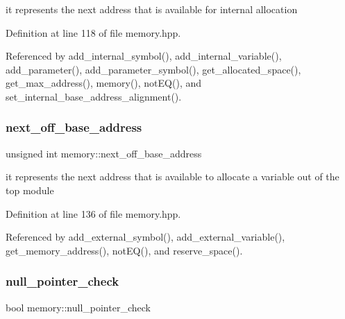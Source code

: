 it represents the next address that is available for internal allocation 



Definition at line 118 of file memory.\+hpp.



Referenced by add\+\_\+internal\+\_\+symbol(), add\+\_\+internal\+\_\+variable(), add\+\_\+parameter(), add\+\_\+parameter\+\_\+symbol(), get\+\_\+allocated\+\_\+space(), get\+\_\+max\+\_\+address(), memory(), not\+E\+Q(), and set\+\_\+internal\+\_\+base\+\_\+address\+\_\+alignment().

\mbox{\label{classmemory_a276dd744b44a4862ff5d6c294d638965}} 
\subsubsection{\texorpdfstring{next\+\_\+off\+\_\+base\+\_\+address}{next\_off\_base\_address}}
{\footnotesize\ttfamily unsigned int memory\+::next\+\_\+off\+\_\+base\+\_\+address\hspace{0.3cm}{\ttfamily [private]}}



it represents the next address that is available to allocate a variable out of the top module 



Definition at line 136 of file memory.\+hpp.



Referenced by add\+\_\+external\+\_\+symbol(), add\+\_\+external\+\_\+variable(), get\+\_\+memory\+\_\+address(), not\+E\+Q(), and reserve\+\_\+space().

\mbox{\label{classmemory_af76a7dbf11a240c8f8664444295701aa}} 
\subsubsection{\texorpdfstring{null\+\_\+pointer\+\_\+check}{null\_pointer\_check}}
{\footnotesize\ttfamily bool memory\+::null\+\_\+pointer\+\_\+check\hspace{0.3cm}{\ttfamily [private]}}



